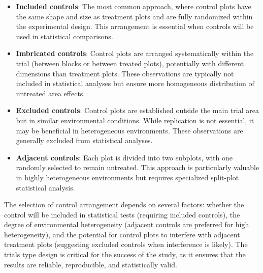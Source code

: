 \documentclass[12pt,a4paper,oneside]{report}
\begin{document}
\begin{itemize}
    \item \textbf{Included controls}: The most common approach, where control plots 
    have the same shape and size as treatment plots and are fully randomized within 
    the experimental design. This arrangement is essential when controls 
    will be used in statistical comparisons.
    
    \item \textbf{Imbricated controls}: Control plots are arranged systematically 
    within the trial (between blocks or between treated plots), potentially with 
    different dimensions than treatment plots. These observations are typically 
    not included in statistical analyses but ensure more homogeneous distribution 
    of untreated area effects.
    
    \item \textbf{Excluded controls}: Control plots are established outside the 
    main trial area but in similar environmental conditions. While replication is 
    not essential, it may be beneficial in heterogeneous environments. These observations 
    are generally excluded from statistical analyses.
    
    \item \textbf{Adjacent controls}: Each plot is divided into two subplots, with 
    one randomly selected to remain untreated. This approach is particularly valuable 
    in highly heterogeneous environments but requires specialized split-plot statistical 
    analysis.
\end{itemize}

The selection of control arrangement depends on several factors: whether the control 
will be included in statistical tests (requiring included controls), the degree 
of environmental heterogeneity (adjacent controls are preferred for high heterogeneity), 
and the potential for control plots to interfere with adjacent treatment plots (suggesting 
excluded controls when interference is likely).
The trials type design is critical for the success of the study, as it ensures
that the results are reliable, reproducible, and statistically valid.
\end{document}
